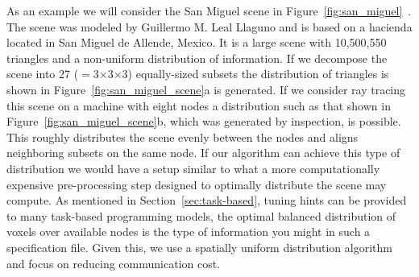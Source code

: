 As an example we will consider the San Miguel scene in
Figure~\ref{fig:san_miguel}~\cite{san-miguel-image}.  The scene was modeled by 
Guillermo M. Leal Llaguno and is based on a hacienda located in San Miguel de 
Allende, Mexico.  It is a large scene with 10,500,550 triangles and a
non-uniform distribution of information.  If we decompose the scene into 27
($=$3$\times$3$\times$3) equally-sized subsets the distribution of triangles is
shown in Figure~\ref{fig:san_miguel_scene}a is generated.  If we consider ray
tracing this scene on a machine with eight nodes a distribution such as that shown in 
Figure~\ref{fig:san_miguel_scene}b, which was generated by inspection, is
possible.  This roughly distributes the scene evenly between the nodes and
aligns neighboring subsets on the same node. If our algorithm can achieve this
type of distribution we would have a setup similar to what a more computationally
expensive pre-processing step designed to optimally distribute the scene may
compute.  As mentioned in Section~\ref{sec:task-based}, tuning hints can be
provided to many task-based programming models, the optimal balanced
distribution of voxels over available nodes is the type of information you 
might in such a specification file.  Given this, we use a spatially uniform
distribution algorithm and focus on reducing communication cost.

